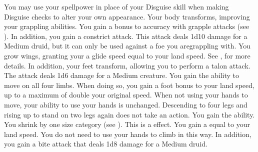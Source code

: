         You may use your spellpower in place of your Disguise skill when making Disguise checks to alter your own appearance.
        Your body transforms, improving your grappling abilities.
        You gain a  bonus to accuracy with grapple attacks (see ).
        In addition, you gain a constrict attack.
        This attack deals 1d10 damage for a Medium druid, but it can only be used against a foe you aregrappling with.
        You grow wings, granting your a glide speed equal to your land speed.
        See , for more details.
        In addition, your feet transform, allowing you to perform a talon attack.
        The attack deals 1d6 damage for a Medium creature.
        You gain the ability to move on all four limbs.
        When doing so, you gain a  foot bonus to your land speed, up to a maximum of double your original speed.
        When not using your hands to move, your ability to use your hands is unchanged.
        Descending to four legs and rising up to stand on two legs again does not take an action.
        You gain the  ability.
        You shrink by one size category (see ).
        This is a  effect.
        You gain a  equal to your land speed.
        You do not need to use your hands to climb in this way.
        In addition, you gain a bite attack that deals 1d8 damage for a Medium druid.


